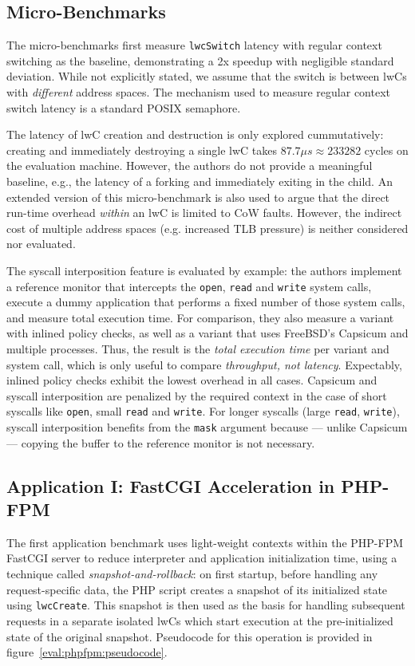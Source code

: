 \documentclass[10pt,twocolumn,letter]{article}
\begin{document}
\subsection{Micro-Benchmarks}
The micro-benchmarks first measure \lstinline{lwcSwitch} latency with regular context switching as the baseline, demonstrating a 2x speedup with negligible standard deviation.
While not explicitly stated, we assume that the switch is between lwCs with \textit{different} address spaces.
The mechanism used to measure regular context switch latency is a standard POSIX semaphore.

The latency of lwC creation and destruction is only explored cummutatively: creating and immediately destroying a single lwC takes $87.7\mu s \approx 233282$ cycles on the evaluation machine. %
However, the authors do not provide a meaningful baseline, e.g., the latency of a forking and immediately exiting in the child.
An extended version of this micro-benchmark is also used to argue that the direct run-time overhead \textit{within} an lwC is limited to CoW faults.
However, the indirect cost of multiple address spaces (e.g. increased TLB pressure) is neither considered nor evaluated.

The syscall interposition feature is evaluated by example:
the authors implement a reference monitor that intercepts the \lstinline{open}, \lstinline{read} and \lstinline{write} system calls, execute a dummy application that performs a fixed number of those system calls, and measure total execution time.
For comparison, they also measure a variant with inlined policy checks, as well as a variant that uses FreeBSD's Capsicum and multiple processes.
Thus, the result is the \textit{total execution time} per variant and system call, which is only useful to compare \textit{throughput, not latency}.
Expectably, inlined policy checks exhibit the lowest overhead in all cases.
Capsicum and syscall interposition are penalized by the required context in the case of short syscalls like \lstinline{open}, small \lstinline{read} and \lstinline{write}.
For longer syscalls (large \lstinline{read}, \lstinline{write}), syscall interposition benefits from the \lstinline{mask} argument because --- unlike Capsicum --- copying the buffer to the reference monitor is not necessary.

\subsection{Application I: FastCGI Acceleration in PHP-FPM}
The first application benchmark uses light-weight contexts within the PHP-FPM FastCGI server to reduce interpreter and application initialization time, using a technique called \textit{snapshot-and-rollback}:
on first startup, before handling any request-specific data, the PHP script creates a snapshot of its initialized state using \lstinline{lwcCreate}.
This snapshot is then used as the basis for handling subsequent requests in a separate isolated lwCs which start execution at the pre-initialized state of the original snapshot.
Pseudocode for this operation is provided in figure~\ref{eval:phpfpm:pseudocode}.
\end{document}
